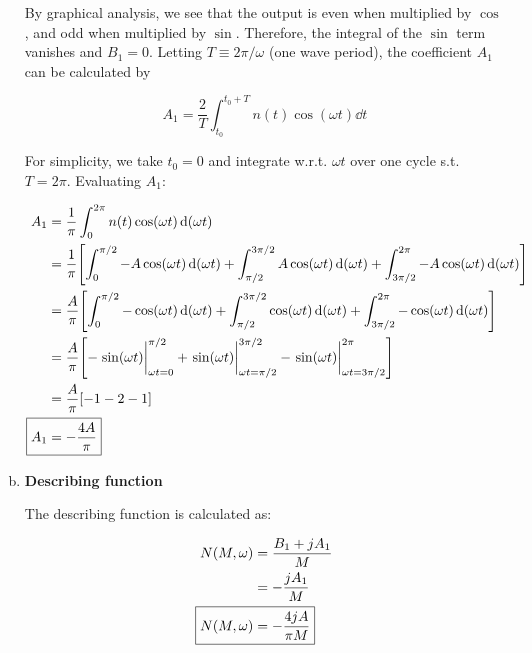 \documentclass[12pt,a4paper]{article}
\begin{document}
\begin{enumerate}[a)]
By graphical analysis, we see that the output is even when multiplied by $\cos$, and odd when multiplied by $\sin$. Therefore, the integral of the $\sin$ term vanishes and $\boxed{B_1 = 0}$. Letting $T \equiv 2\pi/\omega$ (one wave period), the coefficient $A_1$ can be calculated by

\begin{equation}
	A_1 = \frac{2}{T} \int_{t_0}^{t_0 + T} n(t)\cos(\omega t) \dd{t}
\end{equation}

For simplicity, we take $t_0 = 0$ and integrate w.r.t. $\omega t$ over one cycle s.t. $T = 2\pi$. Evaluating $A_1$:

\begin{align}
	A_1 &= \frac{1}{\pi} \int_0^{2\pi} n(t)\cos(\omega t)\dd{(\omega t)} \\
	&= \frac{1}{\pi} \qty[\int_0^{\pi/2} -A\cos(\omega t) \dd{(\omega t)} + \int_{\pi/2}^{3\pi/2} A\cos(\omega t) \dd{(\omega t)} + \int_{3\pi/2}^{2\pi} -A\cos(\omega t) \dd{(\omega t)}] \\
	&= \frac{A}{\pi} \qty[\int_0^{\pi/2} -\cos(\omega t) \dd{(\omega t)} + \int_{\pi/2}^{3\pi/2} \cos(\omega t) \dd{(\omega t)} + \int_{3\pi/2}^{2\pi} -\cos(\omega t) \dd{(\omega t)}] \\
	&= \frac{A}{\pi} \qty[-\eval{\sin(\omega t)}_{\omega t = 0}^{\pi/2} + \eval{\sin(\omega t)}_{\omega t = \pi/2}^{3\pi/2} - \eval{\sin(\omega t)}_{\omega t = 3\pi/2}^{2\pi}] \\
	&= \frac{A}{\pi} \qty[-1 - 2 - 1] \\
	\Aboxed{
		A_1 &= -\frac{4A}{\pi}
	} \label{eq:A1}
\end{align}

\item \textbf{Describing function}

The describing function is calculated as:

\begin{align}
	N(M, \omega) &= \frac{B_1 + jA_1}{M} \\
	&= -\frac{jA_1}{M} \\
	\Aboxed{
		N(M, \omega) &= -\frac{4jA}{\pi M}
	} \label{eq:N}
\end{align}

\end{enumerate}
\end{document}
